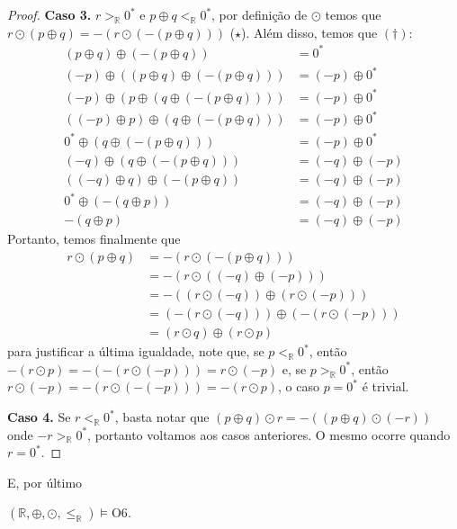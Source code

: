 \documentclass[11pt]{article}
\newcommand{\mbb}[1]{\mathbb{#1}}
\newcommand{\ltr}{<_\mbb{R}}
\newcommand{\leqr}{\leq_\mbb{R}}
\newcommand{\gtr}{>_\mbb{R}}
\begin{document}
\begin{proof}
    \textbf{Caso 3.} $r\gtr0^*$ e $p\oplus q\ltr0^*$, por definição de $\odot$ temos que $r\odot(p\oplus q)=-(r\odot(-(p\oplus q)))$ ($\star$). Além disso, temos que $(\dagger)$:
    \begin{align*}
        (p\oplus q)\oplus(-(p\oplus q)) & =0^*\tag{A4}\\
        (-p)\oplus((p\oplus q)\oplus(-(p\oplus q))) & =(-p)\oplus0^*\\
        (-p)\oplus(p\oplus (q\oplus(-(p\oplus q)))) & = (-p)\oplus 0^*\tag{A1}\\
        ((-p)\oplus p)\oplus(q\oplus(-(p\oplus q))) & = (-p)\oplus0^*\tag{A1}\\
        0^*\oplus(q\oplus(-(p\oplus q))) & = (-p)\oplus 0^*\tag{A4}\\
        (-q)\oplus(q\oplus(-(p\oplus q))) & = (-q)\oplus(-p)\tag{A3}\\
        ((-q)\oplus q)\oplus(-(p\oplus q)) & = (-q)\oplus (-p)\tag{A1}\\
        0^*\oplus(-(q\oplus p)) & = (-q)\oplus(-p)\tag{A4}\\
        -(q\oplus p) & = (-q)\oplus(-p)\tag{A3}
    \end{align*}
    Portanto, temos finalmente que
    \begin{align*}
        r\odot(p\oplus q) & = -(r\odot(-(p\oplus q)))\tag{$\star$}\\
        & = -(r\odot((-q)\oplus(-p)))\tag{$\dagger$}\\
        & = -((r\odot(-q))\oplus(r\odot(-p)))\tag{Caso 2.}\\
        & = (-(r\odot(-q)))\oplus(-(r\odot(-p)))\tag{$\dagger$}\\
        & = (r\odot q)\oplus(r\odot p)
    \end{align*}
    para justificar a última igualdade, note que, se $p\ltr0^*$, então $-(r\odot p)=-(-(r\odot(-p)))=r\odot(-p)$ e, se $p\gtr0^*$, então $r\odot(-p)=-(r\odot(-(-p)))=-(r\odot p)$, o caso $p=0^*$ é trivial.

    \textbf{Caso 4.} Se $r\ltr0^*$, basta notar que $(p\oplus q)\odot r=-((p\oplus q)\odot(-r))$ onde $-r\gtr0^*$, portanto voltamos aos casos anteriores. O mesmo ocorre quando $r=0^*$.
\end{proof}

E, por último

\begin{shaded}
\begin{theorem}
    $(\mbb{R},\oplus,\odot,\leqr)\vDash\text{O6}$.
\end{theorem}
\end{shaded}
\end{document}
